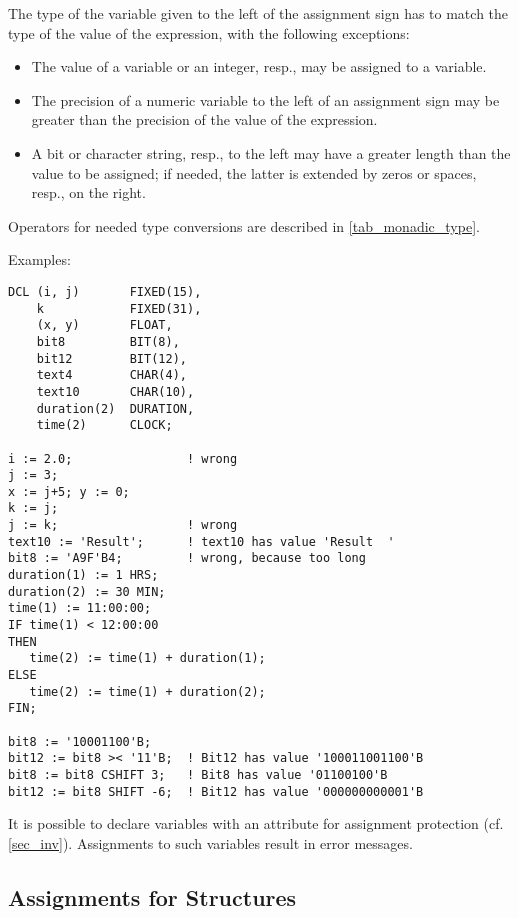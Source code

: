 
The type of the variable given to the left of the assignment sign has to
match the type of the value of the expression, with the following
exceptions:
\begin{itemize}
\item The value of a  variable or an integer, resp., may be
assigned to a  variable.
\item The precision of a numeric variable to the left of an assignment
sign may be greater than the precision of the value of the expression.
\item A bit or character string, resp., to the left may have a greater
length than the value to be assigned; if needed, the latter is extended
by zeros or spaces, resp., on the right.
\end{itemize}

Operators for needed type conversions are described in \ref{tab_monadic_type}.

Examples:

\begin{lstlisting}
DCL (i, j)       FIXED(15),
    k            FIXED(31),
    (x, y)       FLOAT,
    bit8         BIT(8),
    bit12        BIT(12),
    text4        CHAR(4),
    text10       CHAR(10),
    duration(2)  DURATION,
    time(2)      CLOCK;

i := 2.0;                ! wrong 
j := 3;   
x := j+5; y := 0; 
k := j;  
j := k;                  ! wrong
text10 := 'Result';      ! text10 has value 'Result  ' 
bit8 := 'A9F'B4;         ! wrong, because too long 
duration(1) := 1 HRS; 
duration(2) := 30 MIN;
time(1) := 11:00:00; 
IF time(1) < 12:00:00 
THEN
   time(2) := time(1) + duration(1);
ELSE
   time(2) := time(1) + duration(2);
FIN; 

bit8 := '10001100'B; 
bit12 := bit8 >< '11'B;  ! Bit12 has value '100011001100'B 
bit8 := bit8 CSHIFT 3;   ! Bit8 has value '01100100'B 
bit12 := bit8 SHIFT -6;  ! Bit12 has value '000000000001'B 
\end{lstlisting}

It is possible to declare variables with an attribute for assignment
protection (cf.  \ref{sec_inv}). Assignments to such variables result in error
messages.

\subsection{Assignments for Structures}   %

